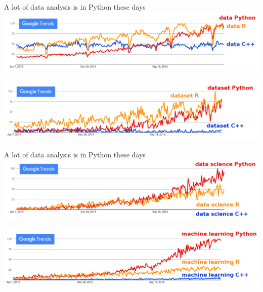 \documentclass[aspectratio=169]{beamer}
\begin{document}

\begin{frame}{A lot of data analysis is in Python these days}
\vspace{0.5 cm}
\includegraphics[width=\linewidth]{python-r-cpp-googletrends-data.png}

\vspace{1 cm}
\includegraphics[width=\linewidth]{python-r-cpp-googletrends-dataset.png}
\end{frame}

\begin{frame}{A lot of data analysis is in Python these days}
\vspace{0.5 cm}
\includegraphics[width=\linewidth]{python-r-cpp-googletrends-datascience.png}

\vspace{1 cm}
\includegraphics[width=\linewidth]{python-r-cpp-googletrends-machinelearning.png}
\end{frame}
\end{document}
